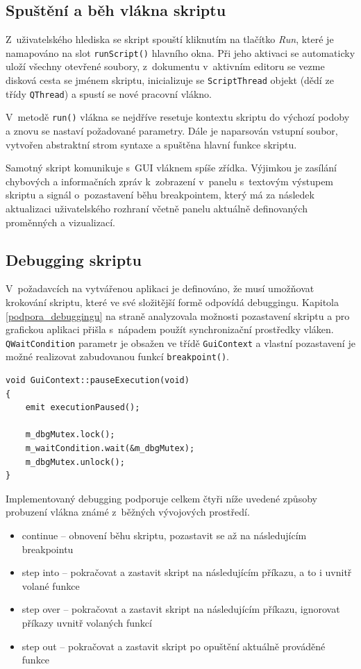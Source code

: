 \documentclass[11pt,twoside,a4paper]{book}
\begin{document}
\subsection{Spuštění a běh vlákna skriptu}

Z~uživatelského hlediska se skript spouští kliknutím na tlačítko \textit{Run}, které je namapováno na slot \texttt{runScript()} hlavního okna. Při jeho aktivaci se automaticky uloží všechny otevřené soubory, z~dokumentu v~aktivním editoru se vezme disková cesta se jménem skriptu, inicializuje se \texttt{ScriptThread} objekt (dědí ze třídy \texttt{QThread}) a spustí se nové pracovní vlákno.

V~metodě \texttt{run()} vlákna se nejdříve resetuje kontextu skriptu do výchozí podoby a znovu se nastaví požadované parametry. Dále je naparsován vstupní soubor, vytvořen abstraktní strom syntaxe a spuštěna hlavní funkce skriptu.

Samotný skript komunikuje s~GUI vláknem spíše zřídka. Výjimkou je zasílání chybových a informačních zpráv k~zobrazení v~panelu s~textovým výstupem skriptu a signál o~pozastavení běhu breakpointem, který má za následek aktualizaci uživatelského rozhraní včetně panelu aktuálně definovaných proměnných a vizualizací.


\subsection{Debugging skriptu}

V~požadavcích na vytvářenou aplikaci je definováno, že musí umožňovat krokování skriptu, které ve své složitější formě odpovídá debuggingu. Kapitola \ref{podpora_debuggingu} na straně \pageref{podpora_debuggingu} analyzovala možnosti pozastavení skriptu a pro grafickou aplikaci přišla s~nápadem použít synchronizační prostředky vláken. \texttt{QWaitCondition} parametr je obsažen ve třídě \texttt{GuiContext} a vlastní pozastavení je možné realizovat zabudovanou funkcí \texttt{breakpoint()}.

\begin{verbatim}
void GuiContext::pauseExecution(void)
{
    emit executionPaused();

    m_dbgMutex.lock();
    m_waitCondition.wait(&m_dbgMutex);
    m_dbgMutex.unlock();
}
\end{verbatim}

Implementovaný debugging podporuje celkem čtyři níže uvedené způsoby probuzení vlákna známé z~běžných vývojových prostředí.

\begin{itemize}
\item continue -- obnovení běhu skriptu, pozastavit se až na následujícím breakpointu
\item step into -- pokračovat a zastavit skript na následujícím příkazu, a to i uvnitř volané funkce
\item step over -- pokračovat a zastavit skript na následujícím příkazu, ignorovat příkazy uvnitř volaných funkcí
\item step out -- pokračovat a zastavit skript po opuštění aktuálně prováděné funkce
\end{itemize}
\end{document}
